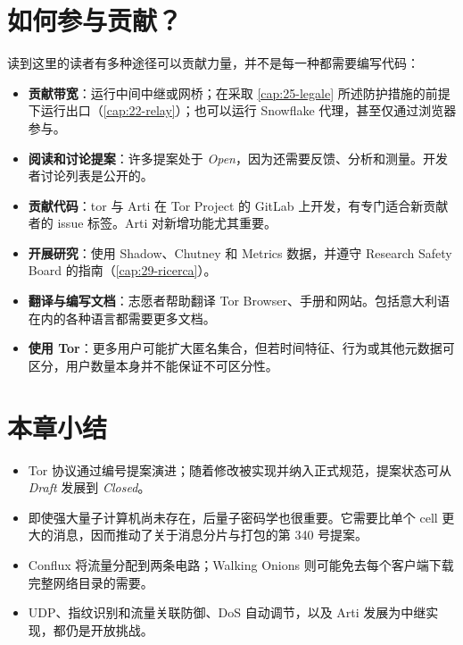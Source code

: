 \section{如何参与贡献？}\label{sec:fut-contribuire}

读到这里的读者有多种途径可以贡献力量，并不是每一种都需要编写代码：
\begin{itemize}
  \item \textbf{贡献带宽}：运行中间中继或网桥；在采取 \cref{cap:25-legale} 所述防护措施的前提下运行出口（\cref{cap:22-relay}）；也可以运行 Snowflake 代理，甚至仅通过浏览器参与。
  \item \textbf{阅读和讨论提案}：许多提案处于 \emph{Open}，因为还需要反馈、分析和测量。开发者讨论列表是公开的。
  \item \textbf{贡献代码}：tor 与 Arti 在 Tor Project 的 GitLab 上开发，有专门适合新贡献者的 issue 标签。Arti 对新增功能尤其重要。
  \item \textbf{开展研究}：使用 Shadow、Chutney 和 Metrics 数据，并遵守 Research Safety Board 的指南（\cref{cap:29-ricerca}）。
  \item \textbf{翻译与编写文档}：志愿者帮助翻译 Tor Browser、手册和网站。包括意大利语在内的各种语言都需要更多文档。
  \item \textbf{使用 Tor}：更多用户可能扩大匿名集合，但若时间特征、行为或其他元数据可区分，用户数量本身并不能保证不可区分性。
\end{itemize}

\section*{本章小结}
\begin{itemize}
  \item Tor 协议通过编号提案演进；随着修改被实现并纳入正式规范，提案状态可从 \emph{Draft} 发展到 \emph{Closed}。
  \item 即使强大量子计算机尚未存在，后量子密码学也很重要。它需要比单个 cell 更大的消息，因而推动了关于消息分片与打包的第 340 号提案。
  \item Conflux 将流量分配到两条电路；Walking Onions 则可能免去每个客户端下载完整网络目录的需要。
  \item UDP、指纹识别和流量关联防御、DoS 自动调节，以及 Arti 发展为中继实现，都仍是开放挑战。
\end{itemize}


